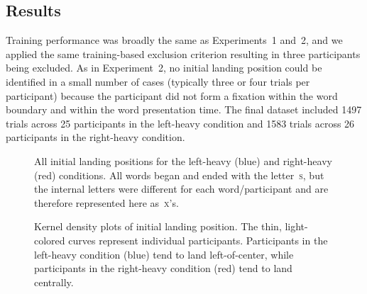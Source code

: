 \documentclass[doc,biblatex,floatsintext]{apa7}
\begin{document}
\subsection{Results}

Training performance was broadly the same as Experiments~1 and~2, and we applied the same training-based exclusion criterion resulting in three participants being excluded. As in Experiment~2, no initial landing position could be identified in a small number of cases (typically three or four trials per participant) because the participant did not form a fixation within the word boundary and within the word presentation time. The final dataset included 1497 trials across 25 participants in the left-heavy condition and 1583 trials across 26 participants in the right-heavy condition.

\begin{figure}
\vspace*{2pt}
\caption{All initial landing positions for the left-heavy (blue) and right-heavy (red) conditions. All words began and ended with the letter~\textsc{s}, but the internal letters were different for each word/participant and are therefore represented here as~\textsc{x}'s.}
\label{fig13}
\end{figure}

\begin{figure}
\vspace*{2pt}
\caption{Kernel density plots of initial landing position. The thin, light-colored curves represent individual participants. Participants in the left-heavy condition (blue) tend to land left-of-center, while participants in the right-heavy condition (red) tend to land centrally.}
\label{fig14}
\end{figure}
\end{document}
